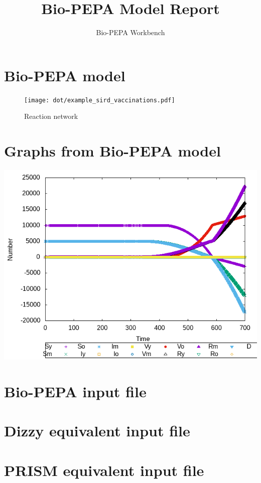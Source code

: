 \documentclass{llncs}
\title{Bio-PEPA Model Report}
\author{Bio-PEPA Workbench}
\institute{\today}
\begin{document}
\maketitle
\section{Bio-PEPA model}

\begin{figure}[htbp]
\begin{center}
\texttt{[image: dot/example\_sird\_vaccinations.pdf]}
\caption{Reaction network}
\end{center}
\end{figure}
\newpage
\section{Graphs from Bio-PEPA model}
\includegraphics[scale=1]{png/example_sird_vaccinations001_sundials_results_0}
\appendix
\newpage
\section{Bio-PEPA input file}

\newpage
\section{Dizzy equivalent input file}

\newpage
\section{PRISM equivalent input file}

\end{document}
